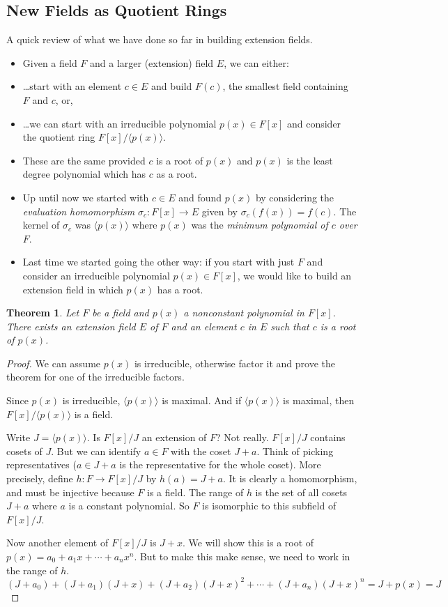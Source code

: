 \documentclass[12pt]{article}
\theoremstyle{plain}
\newtheorem*{theorem}{Theorem}
\theoremstyle{definition}
\theoremstyle{remark}
\newcommand{\todayis}[1]{\clearpage{\rhead{\footnotesize #1}}}
\begin{document}
\todayis{Monday, January 14}

\subsection*{New Fields as Quotient Rings}

A quick review of what we have done so far in building extension fields.  
\begin{itemize}
\item Given a field $F$ and a larger (extension) field $E$, we can either:
\item \ldots start with an element $c \in E$ and build $F(c)$, the smallest field containing $F$ and $c$, or,
\item \ldots we can start with an irreducible polynomial $p(x) \in F[x]$ and consider the quotient ring $F[x]/\langle p(x)\rangle$.
\item These are the same provided $c$ is a root of $p(x)$ and $p(x)$ is the least degree polynomial which has $c$ as a root.
\item Up until now we started with $c \in E$ and found $p(x)$ by considering the {\em evaluation homomorphism} $\sigma_c:F[x] \to E$ given by $\sigma_c(f(x)) = f(c)$.  The kernel of $\sigma_c$ was $\langle p(x)\rangle$ where $p(x)$ was the {\em minimum polynomial of $c$ over $F$}.
\item Last time we started going the other way: if you start with just $F$ and consider an irreducible polynomial $p(x) \in F[x]$, we would like to build an extension field in which $p(x)$ has a root.  
\end{itemize}


\begin{theorem}
Let $F$ be a field and $p(x)$ a nonconstant polynomial in $F[x]$.  There exists an extension field $E$ of $F$ and an element $c$ in $E$ such that $c$ is a root of $p(x)$.
\end{theorem}

\begin{proof}
We can assume $p(x)$ is irreducible, otherwise factor it and prove the theorem for one of the irreducible factors.

Since $p(x)$ is irreducible, $\langle p(x) \rangle$ is maximal.  And if $\langle p(x)\rangle$ is maximal, then $F[x]/\langle p(x)\rangle$ is a field.

Write $J = \langle p(x)\rangle$.  Is $F[x]/J$ an extension of $F$?  Not really.  $F[x]/J$ contains cosets of $J$.  But we can identify $a \in F$ with the coset $J+a$.  Think of picking representatives ($a \in J+a$ is the representative for the whole coset).  More precisely, define $h:F \to F[x]/J$ by $h(a) = J+a$. It is clearly a homomorphism, and must be injective because $F$ is a field.  The range of $h$ is the set of all cosets $J+a$ where $a$ is a constant polynomial.  So $F$ is isomorphic to this subfield of $F[x]/J$.

Now another element of $F[x]/J$ is $J+x$.  We will show this is a root of $p(x) = a_0 +a_1x + \cdots +a_nx^n$.  But to make this make sense, we need to work in the range of $h$. 
\[(J+a_0) + (J+a_1)(J+x) + (J+a_2)(J+x)^2 + \cdots + (J+a_n)(J+x)^n = J+p(x) = J\]
\end{proof}
\end{document}
